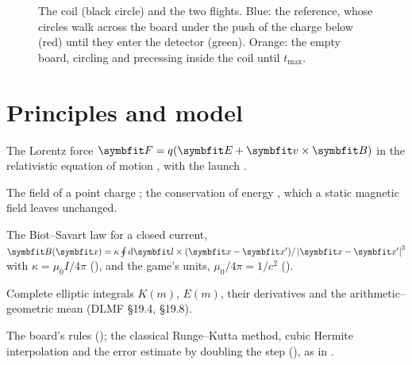 \documentclass{leveldoc}
\begin{document}
\begin{figure}[htbp]
\centering
{}
\caption{The coil (black circle) and the two flights. Blue: the reference, whose circles walk
across the board under the push of the charge below (red) until they enter the detector (green).
Orange: the empty board, circling and precessing inside the coil until $t_{\max}$.}
\label{fig:board}
\end{figure}

\section{Principles and model}\label{sec:model}

\begin{principles}
  \item The Lorentz force $\vect{F} = q(\vect{E} + \vect{v}\times\vect{B})$ in the
    relativistic equation of motion , with the launch
    .
  \item The field of a point charge ; the conservation of energy
    , which a static magnetic field leaves unchanged.
  \item The Biot--Savart law for a closed current, $\vect{B}(\vect{x}) =
    \kappa\oint \dd\vect{l}\times(\vect{x} - \vect{x}')/\abs{\vect{x} - \vect{x}'}^3$ with
    $\kappa = \mu_0 I/4\pi$ (), and the game's units, $\mu_0/4\pi = 1/c^2$
    ().
  \item Complete elliptic integrals $K(m)$, $E(m)$, their derivatives and the
    arithmetic--geometric mean (DLMF §19.4, §19.8).
  \item The board's rules (); the classical Runge--Kutta method,
    cubic Hermite interpolation and the error estimate by doubling the step
    (), as in .
\end{principles}
\end{document}
